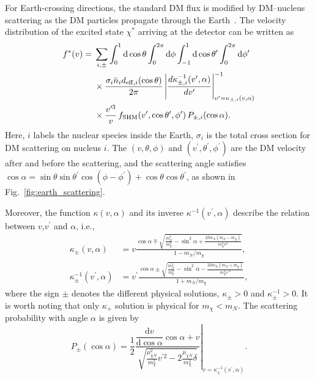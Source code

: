 \documentclass[aps,twocolumn,prl,showpacs,showkeys,preprintnumbers,superscriptaddress,nobibnotes,floatfix,nofootinbib]{revtex4-2}
\begin{document}
For Earth-crossing directions, the standard DM flux is modified by DM--nucleus scattering as the DM particles propagate through the Earth~\cite{Kavanagh:2016pyr,Emken:2021vmf}. The velocity distribution of the excited state $\chi^\ast$ arriving at the detector can be written as~\cite{Emken:2021vmf}
\begin{equation}
\begin{aligned}
f^\ast(v)={}& \sum_{i,\pm} \int_0^1 \mathrm{d}\cos\theta \int_0^{2\pi}\mathrm{d}\phi \int_{-1}^{1}\mathrm{d}\cos\theta^\prime \int_{0}^{2 \pi} \mathrm{d} \phi^\prime\\
&\times \frac{\sigma_i\bar n_i d_{{\rm eff},i}(\cos\theta)}{2\pi}
\left| \frac{d\kappa_{\pm,i}^{-1}(v',\alpha)}{dv'} \right|^{-1}_{v'=\kappa_{\pm,i}(v,\alpha)} \\
&\times \frac{v'^3}{v}\, f_{\mathrm{SHM}}(v',\cos\theta', \phi^\prime)\, P_{\pm,i}(\cos\alpha).
\end{aligned}
\label{eq:excited_distribution}
\end{equation}
Here, $i$ labels the nuclear species inside the Earth, $\sigma_i$ is the total cross section for DM scattering on nucleus $i$. The $(v,\theta, \phi)$ and $(v^\prime, \theta^{\prime}, \phi^\prime)$ are the DM velocity after and before the scattering, and the scattering angle satisfies $\cos \alpha = \sin \theta \sin\theta^{\prime} \cos (\phi-\phi^{\prime}) + \cos \theta \cos \theta^{\prime}$, as shown in Fig.~\ref{fig:earth_scattering}. 

Moreover, the function $\kappa(v, \alpha)$ and its inverse $\kappa^{-1}(v^\prime, \alpha)$ describe the relation between $v$,$v^\prime$ and $\alpha$, i.e.,
\begin{equation}
    \begin{aligned}
    \kappa_{ \pm}(v, \alpha)&=v \frac{\cos \alpha \mp \sqrt{\frac{m_{N}^{2}}{m_{\chi}^{2}}-\sin ^{2} \alpha+\frac{2 \delta m_{N}\left(m_{N}-m_{\chi}\right)}{m_{\chi}^{3} v^{2}}}}{1-m_{N} / m_{\chi}}, \\
        \kappa_{ \pm}^{-1}\left(v^{\prime}, \alpha\right)&=v^{\prime} \frac{\cos \alpha \pm \sqrt{\frac{m_{N}^{2}}{m_{\chi}^{2}}-\sin ^{2} \alpha-\frac{2 \delta m_{N}\left(m_{N}+m_{\chi}\right)}{m_{\chi}^{3} v^{\prime 2}}}}{1+m_{N} / m_{\chi}},
    \end{aligned}
\end{equation}
where the sign $\pm$ denotes the different physical solutions, $\kappa_{\pm}>0$ and $\kappa^{-1}_{\pm}>0$. It is worth noting that only $\kappa_{+}$ solution is physical for $m_{\chi} <m_{N}$. The scattering probability with angle $\alpha$ is given by 
\begin{equation}
    P_{\pm}(\cos \alpha) = \left.\frac{1}{2} \frac{\dfrac{\mathrm{d} v}{\mathrm{d} \cos \alpha}\cos \alpha+v}{\sqrt{\frac{\mu_{\chi N}^2}{m_{\chi}^2}v^{\prime 2}-2 \frac{\mu_{\chi N}}{m_{\chi}^2}\delta}}\right|_{v= \kappa_{\pm}^{-1}(v^{\prime},\alpha)}.
\end{equation}
\end{document}
